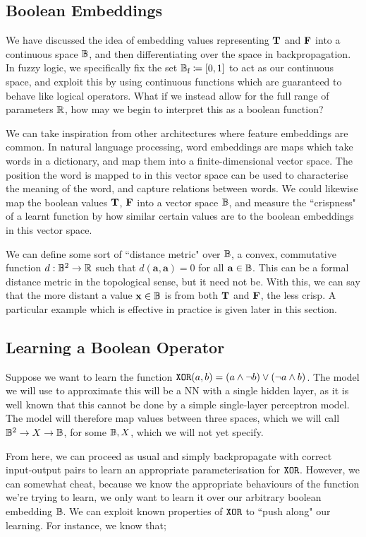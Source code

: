 \documentclass[conference]{report}
\begin{document}
\subsection{Boolean Embeddings}

We have discussed the idea of embedding values representing $\textbf{T}$ and $\textbf{F}$ into a continuous space $\mathbb{B}$, and then differentiating over the space in backpropagation. In fuzzy logic, we specifically fix the set $\mathbb{B}_\text{f}\coloneqq[0,1]$ to act as our continuous space, and exploit this by using continuous functions which are guaranteed to behave like logical operators. What if we instead allow for the full range of parameters $\mathbb{R}$, how may we begin to interpret this as a boolean function?

We can take inspiration from other architectures where feature embeddings are common. In natural language processing, word embeddings are maps which take words in a dictionary, and map them into a finite-dimensional vector space. The position the word is mapped to in this vector space can be used to characterise the meaning of the word, and capture relations between words. We could likewise map the boolean values $\textbf{T}$, $\textbf{F}$ into a vector space $\mathbb{B}$, and measure the ``crispness" of a learnt function by how similar certain values are to the boolean embeddings in this vector space.

We can define some sort of ``distance metric" over $\mathbb{B}$, a convex, commutative function $d : \mathbb{B}^2 \to \mathbb{R}$ such that $d(\mathbf{a, a}) = 0$ for all $\mathbf{a} \in \mathbb{B}$. This can be a formal distance metric in the topological sense, but it need not be. With this, we can say that the more distant a value $\mathbf{x} \in \mathbb{B}$ is from both $\textbf{T}$ and $\textbf{F}$, the less crisp. A particular example which is effective in practice is given later in this section.

\subsection{Learning a Boolean Operator}

Suppose we want to learn the function $\texttt{XOR}(a, b) = (a \land \lnot b) \lor (\lnot a \land b)$. The model we will use to approximate this will be a NN with a single hidden layer, as it is well known that this cannot be done by a simple single-layer perceptron model. The model will therefore map values between three spaces, which we will call $\mathbb{B}^2 \to X \to \mathbb{B}$, for some $\mathbb{B}, X$, which we will not yet specify.

From here, we can proceed as usual and simply backpropagate with correct input-output pairs to learn an appropriate parameterisation for $\texttt{XOR}$. However, we can somewhat cheat, because we know the appropriate behaviours of the function we're trying to learn, we only want to learn it over our arbitrary boolean embedding $\mathbb{B}$. We can exploit known properties of $\texttt{XOR}$ to ``push along" our learning. For instance, we know that;
\end{document}
